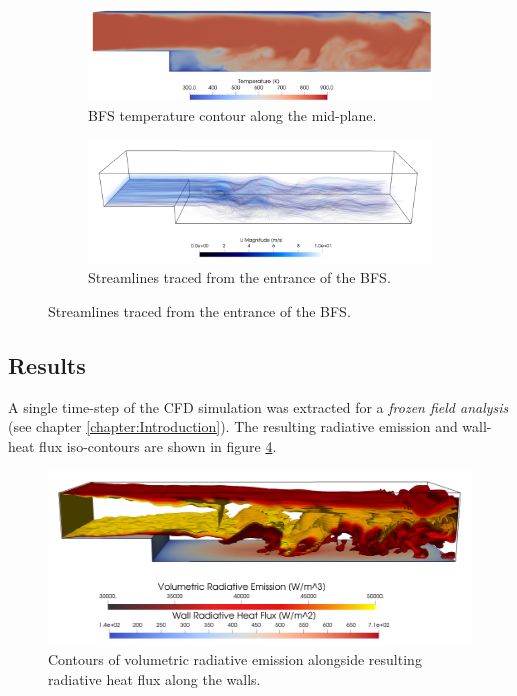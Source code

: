 \begin{figure}

\end{figure}
\begin{figure}
  \begin{subfigure}{1\textwidth}
  \includegraphics[width=\linewidth]{figures/ch4/BFS_temperature.png}
  \caption{BFS temperature contour along the mid-plane. }
  \label{fig:BFS_temperature}
  \end{subfigure}
  \begin{subfigure}{1\textwidth}
  \includegraphics[width=\linewidth]{figures/ch4/BFS_streamlines6.png}
  \caption{Streamlines traced from the entrance of the BFS.}
  \label{fig:BFS_streamlines}
  \end{subfigure}
  \label{fig:BFS_contours}
\end{figure}

\subsection{Results}
A single time-step of the CFD simulation was extracted for a \textit{frozen field analysis} (see chapter \ref{chapter:Introduction}). 
The resulting radiative emission and wall-heat flux iso-contours are shown in figure \ref{fig:BFS_radiationcontours}.


\begin{figure}
\includegraphics[width=\linewidth]{figures/ch4/BFS_volwallflux3.png}
\caption{Contours of volumetric radiative emission alongside resulting radiative heat flux along the walls.}
\label{fig:BFS_radiationcontours}
\end{figure}


